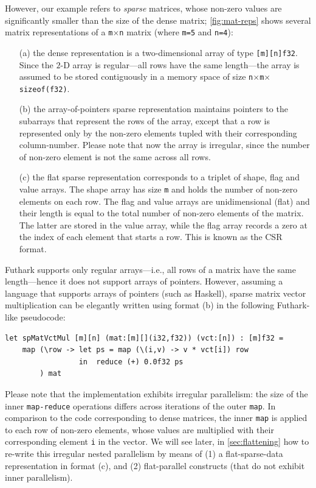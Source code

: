 \documentclass[acmsmall,review]{acmart}\settopmatter{printfolios=true,printccs=false,printacmref=false}
\begin{document}
However, our example refers to {\em sparse} matrices, whose non-zero
values are significantly smaller than the size of the dense matrix;
\cref{fig:mat-reps} shows several matrix representations
of a {\tt m$\times$n} matrix (where {\tt m=5} and {\tt n=4}):
\begin{itemize}
    \item[(a)] the dense representation is a two-dimensional
        array of type \lstinline{[m][n]f32}. Since the $2$-D array
        is regular---all rows have the same length---the array is 
        assumed to be stored contiguously in a memory space of
        size {\tt n$\times$m$\times$sizeof(f32)}.
    \item[(b)] the array-of-pointers sparse representation maintains
        pointers to the subarrays that represent the rows of the array,
        except that a row is represented only by the non-zero elements
        tupled with their corresponding column-number. Please note
        that now the array is irregular, since the number of non-zero
        element is not the same across all rows. 
    \item[(c)] the flat sparse representation corresponds to a triplet
        of shape, flag and value arrays. The shape array has size {\tt m}
        and holds the number of non-zero elements on each row. The
        flag and value arrays are unidimensional (flat) and their length
        is equal to the total number of non-zero elements of the matrix.
        The latter are stored in the value array, while the flag array
        records a zero at the index of each element that starts a row.
        This is known as the CSR format.
\end{itemize}

Futhark supports only regular arrays---i.e., all rows of a matrix have 
the same length---hence it does not support arrays of pointers. 
However, assuming a language that supports arrays of pointers 
(such as Haskell), sparse matrix vector multiplication can be 
elegantly written using format (b) in the following Futhark-like 
pseudocode:\medskip

\begin{lstlisting}[mathescape=true]
let spMatVctMul [m][n] (mat:[m][](i32,f32)) (vct:[n]) : [m]f32 =
    map (\row -> let ps = map (\(i,v) -> v * vct[i]) row
                 in  reduce (+) 0.0f32 ps 
        ) mat
\end{lstlisting}\vspace{-2ex} 
Please note that the implementation exhibits irregular parallelism:
the size of the inner \lstinline{map-reduce} operations differs 
across iterations of the outer \lstinline{map}. In comparison to
the code corresponding to dense matrices, the inner \lstinline{map} 
is applied to each row of non-zero elements, whose values are multiplied 
with their corresponding element {\tt i} in the vector.
%
We will see later, in \cref{sec:flattening} how to re-write this 
irregular nested parallelism by means of (1) a flat-sparse-data 
representation in format (c), and (2) flat-parallel constructs 
(that do not exhibit inner parallelism).\bigskip
\end{document}
